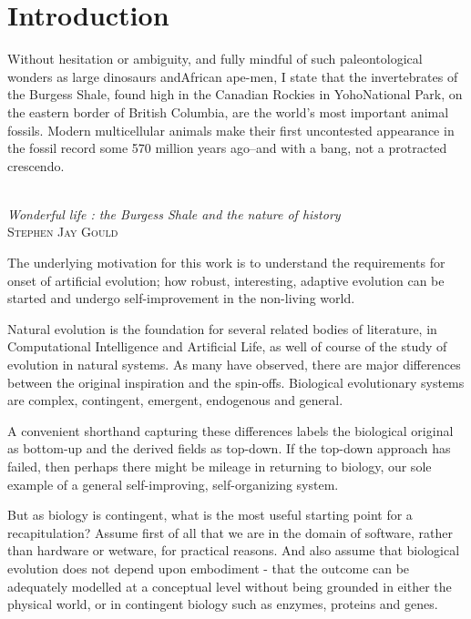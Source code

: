 \chapter{Introduction}\label{introduction}

\settowidth{\epigraphwidth}{Wonderful life : the Burgess Shale and the nature of history}
\epigraph{%
Without hesitation or ambiguity, and fully mindful of such paleontological wonders as large dinosaurs andAfrican ape-men, I state that the invertebrates of the Burgess Shale, found high in the Canadian Rockies in YohoNational Park, on the eastern border of British Columbia, are the world's most important animal fossils. Modern multicellular animals make their first uncontested appearance in the fossil record some 570 million years ago--and with a bang, not a protracted crescendo.}%
{\textit{\\Wonderful life : the Burgess Shale and the nature of history}\\\textsc{Stephen Jay Gould}}

The underlying motivation for this work is to understand the requirements for onset of artificial evolution; how robust, interesting, adaptive evolution can be started and undergo self-improvement in the non-living world.

Natural evolution is the foundation for several related bodies of literature, in Computational Intelligence and Artificial Life, as well of course of the study of evolution in natural systems. As many have observed, there are major differences between the original inspiration and the spin-offs. Biological evolutionary systems are complex, contingent, emergent, endogenous and general. 

A convenient shorthand capturing these differences labels the biological original as bottom-up and the derived fields as top-down. If the top-down approach has failed, then perhaps there might be mileage in returning to biology, our sole example of a general self-improving, self-organizing system.

But as biology is contingent, what is the most useful starting point for a recapitulation? Assume first of all that we are in the domain of software, rather than hardware or wetware, for practical reasons. And also assume that biological evolution does not depend upon embodiment - that the outcome can be adequately modelled at a conceptual level without being grounded in either the physical world, or in contingent biology such as enzymes, proteins and genes.

